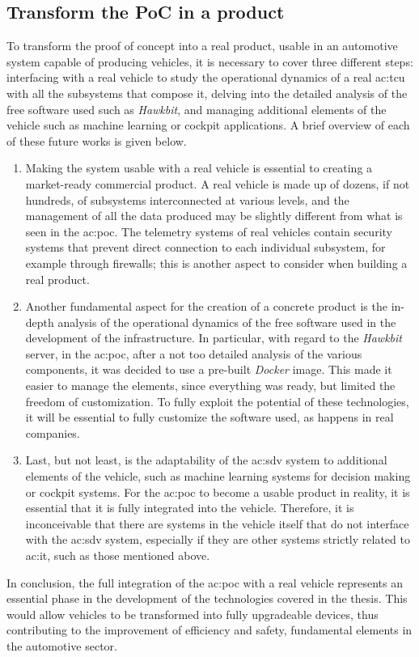 \subsection{Transform the PoC in a product}
To transform the proof of concept into a real product, usable in an automotive system capable of producing vehicles, it is necessary to cover three different steps: interfacing with a real vehicle to study the operational dynamics of a real \gls{ac:tcu} with all the subsystems that compose it, delving into the detailed analysis of the free software used such as \textit{Hawkbit}, and managing additional elements of the vehicle such as machine learning or cockpit applications. A brief overview of each of these future works is given below.
\begin{enumerate}
    \item Making the system usable with a real vehicle is essential to creating a market-ready commercial product. A real vehicle is made up of dozens, if not hundreds, of subsystems interconnected at various levels, and the management of all the data produced may be slightly different from what is seen in the \gls{ac:poc}. The telemetry systems of real vehicles contain security systems that prevent direct connection to each individual subsystem, for example through firewalls; this is another aspect to consider when building a real product.
    \item Another fundamental aspect for the creation of a concrete product is the in-depth analysis of the operational dynamics of the free software used in the development of the infrastructure. In particular, with regard to the \textit{Hawkbit} server, in the \gls{ac:poc}, after a not too detailed analysis of the various components, it was decided to use a pre-built \textit{Docker} image. This made it easier to manage the elements, since everything was ready, but limited the freedom of customization. To fully exploit the potential of these technologies, it will be essential to fully customize the software used, as happens in real companies.
    \item Last, but not least, is the adaptability of the \gls{ac:sdv} system to additional elements of the vehicle, such as machine learning systems for decision making or cockpit systems. For the \gls{ac:poc} to become a usable product in reality, it is essential that it is fully integrated into the vehicle. Therefore, it is inconceivable that there are systems in the vehicle itself that do not interface with the \gls{ac:sdv} system, especially if they are other systems strictly related to \gls{ac:it}, such as those mentioned above.  
\end{enumerate}

In conclusion, the full integration of the \gls{ac:poc} with a real vehicle represents an essential phase in the development of the technologies covered in the thesis. This would allow vehicles to be transformed into fully upgradeable devices, thus contributing to the improvement of efficiency and safety, fundamental elements in the automotive sector.